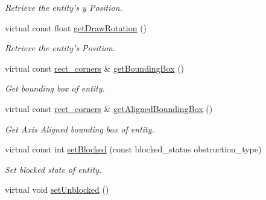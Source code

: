 \begin{DoxyCompactItemize}
\begin{DoxyCompactList}\small\item\em Retrieve the entity's y Position. \end{DoxyCompactList}\item 
\hypertarget{class_turret_a52a79fd86533f6b3d94223a60df41aaa}{virtual const float \hyperlink{class_turret_a52a79fd86533f6b3d94223a60df41aaa}{get\+Draw\+Rotation} ()}\label{class_turret_a52a79fd86533f6b3d94223a60df41aaa}

\begin{DoxyCompactList}\small\item\em Retrieve the entity's Position. \end{DoxyCompactList}\item 
\hypertarget{class_turret_a48007e1c8b99645e13b24e24b850fbaa}{virtual const \hyperlink{structrect__corners}{rect\+\_\+corners} \& \hyperlink{class_turret_a48007e1c8b99645e13b24e24b850fbaa}{get\+Bounding\+Box} ()}\label{class_turret_a48007e1c8b99645e13b24e24b850fbaa}

\begin{DoxyCompactList}\small\item\em Get bounding box of entity. \end{DoxyCompactList}\item 
\hypertarget{class_turret_ad17a5c236d681627bbea6bb99b2374b0}{virtual const \hyperlink{structrect__corners}{rect\+\_\+corners} \& \hyperlink{class_turret_ad17a5c236d681627bbea6bb99b2374b0}{get\+Aligned\+Bounding\+Box} ()}\label{class_turret_ad17a5c236d681627bbea6bb99b2374b0}

\begin{DoxyCompactList}\small\item\em Get Axis Aligned bounding box of entity. \end{DoxyCompactList}\item 
\hypertarget{class_turret_a047fe39c0367cc0896c43ac6fadfd2b6}{virtual const int \hyperlink{class_turret_a047fe39c0367cc0896c43ac6fadfd2b6}{set\+Blocked} (const blocked\+\_\+status obstruction\+\_\+type)}\label{class_turret_a047fe39c0367cc0896c43ac6fadfd2b6}

\begin{DoxyCompactList}\small\item\em Set blocked state of entity. \end{DoxyCompactList}\item 
\hypertarget{class_turret_a1cafbfb89d052d03c8e7db8b0668a75d}{virtual void \hyperlink{class_turret_a1cafbfb89d052d03c8e7db8b0668a75d}{set\+Unblocked} ()}\label{class_turret_a1cafbfb89d052d03c8e7db8b0668a75d}


\end{DoxyCompactItemize}
